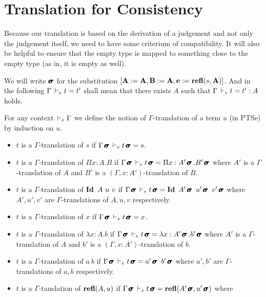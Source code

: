 \documentclass[a4paper,english]{lipics-utf8x}
\begin{document}
  \section{Translation for Consistency}

  Because our translation is based on the derivation of a judgement and not
  only the judgement itself, we need to have some criterium of compatibility.
  It will also be helpful to ensure that the empty type is mapped to something
  close to the empty type (as in, it is empty as well).

  We will write $\operatorname{\pmb{\bm{\sigma}}}$ for the substitution
  $[\operatorname{\mathbf{A}} := \operatorname{\mathbf{A}}, \operatorname{\mathbf{B}} := \operatorname{\mathbf{A}}, \operatorname{\mathbf{e}} := \operatorname{\mathbf{refl}}(s,\operatorname{\mathbf{A}})]$.
  And in the following $\Gamma \,\vdash_e t = t'$ shall mean that there exists $A$
  such that $\Gamma \,\vdash_e t = t' : A$ holds.

  \begin{definition}
    For any context $\,\vdash_e \Gamma$ we define the notion of $\Gamma$-translation
    of a term $u$ (in PTSe) by induction on $u$.
    \begin{itemize}
      \item $t$ is a $\Gamma$-translation of $s$ if
            $\Gamma \operatorname{\pmb{\bm{\sigma}}} \,\vdash_e t \operatorname{\pmb{\bm{\sigma}}} = s$.
      \item $t$ is a $\Gamma$-translation of $\Pi x:A.B$ if
            $\Gamma \operatorname{\pmb{\bm{\sigma}}} \,\vdash_e t \operatorname{\pmb{\bm{\sigma}}} = \Pi x:A'\operatorname{\pmb{\bm{\sigma}}}.B'\operatorname{\pmb{\bm{\sigma}}}$ where
            $A'$ is a $\Gamma$-translation of $A$ and $B'$ is a
            $(\Gamma, x:A')$-translation of $B$.
      \item $t$ is a $\Gamma$-translation of $\operatorname{\mathbf{Id}~} A\ u\ v$ if
            $\Gamma \msigma \dere t \msigma = \Id A'\msigma\ u'\msigma\ %
            v'\msigma$ where $A',u',v'$
            are $\Gamma$-translations of $A,u,v$ respectively.
      \item $t$ is a $\Gamma$-translation of $x$ if
            $\Gamma \operatorname{\pmb{\bm{\sigma}}} \,\vdash_e t \operatorname{\pmb{\bm{\sigma}}} = x$.
      \item $t$ is a $\Gamma$-translation of $\lambda x:A.b$ if
            $\Gamma \operatorname{\pmb{\bm{\sigma}}} \,\vdash_e t \operatorname{\pmb{\bm{\sigma}}} = \lambda x:A'\operatorname{\pmb{\bm{\sigma}}}.b'\operatorname{\pmb{\bm{\sigma}}}$
            where $A'$ is a $\Gamma$-translation of $A$ and $b'$ is a
            $(\Gamma, x:A')$-translation of $b$.
      \item $t$ is a $\Gamma$-translation of $a\ b$ if
            $\Gamma \operatorname{\pmb{\bm{\sigma}}} \,\vdash_e t \operatorname{\pmb{\bm{\sigma}}} = a'\operatorname{\pmb{\bm{\sigma}}}\ b'\operatorname{\pmb{\bm{\sigma}}}$ where
            $a',b'$ are $\Gamma$-translations of $a,b$ respectively.
      \item $t$ is a $\Gamma$-tanslation of $\operatorname{\mathbf{refl}}(A,u)$ if
            $\Gamma \operatorname{\pmb{\bm{\sigma}}} \,\vdash_e t \operatorname{\pmb{\bm{\sigma}}} = \operatorname{\mathbf{refl}}(A'\operatorname{\pmb{\bm{\sigma}}},u'\operatorname{\pmb{\bm{\sigma}}})$ where

\end{itemize}
\end{definition}
\end{document}
